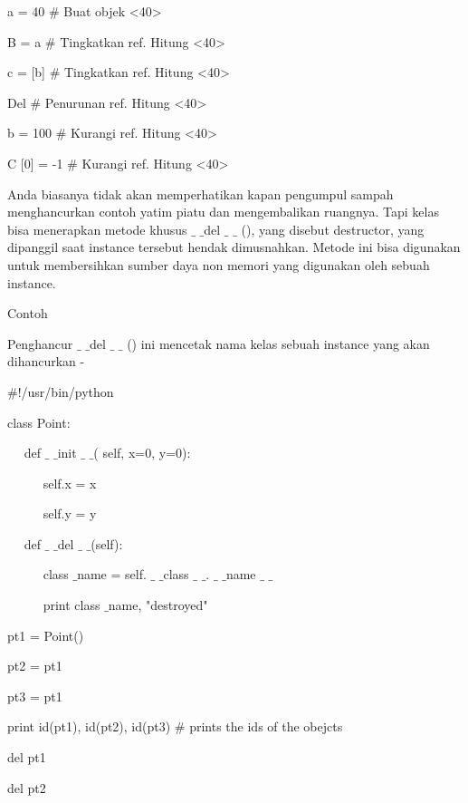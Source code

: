 \vspace{12pt}
a = 40  $  \#  $ Buat objek <40> \par
B = a  $  \#  $ Tingkatkan ref. Hitung <40> \par
c = [b]  $  \#  $ Tingkatkan ref. Hitung <40> \par
\vspace{12pt}
Del  $  \#  $ Penurunan ref. Hitung <40> \par
b = 100  $  \#  $ Kurangi ref. Hitung <40> \par
C [0] = -1  $  \#  $ Kurangi ref. Hitung <40> \par
\vspace{12pt}
Anda biasanya tidak akan memperhatikan kapan pengumpul sampah menghancurkan contoh yatim piatu dan mengembalikan ruangnya. Tapi kelas bisa menerapkan metode khusus  $  \_  $ $  \_  $del  $  \_  $ $  \_  $ (), yang disebut destructor, yang dipanggil saat instance tersebut hendak dimusnahkan. Metode ini bisa digunakan untuk membersihkan sumber daya non memori yang digunakan oleh sebuah instance. \par
Contoh \par
\vspace{12pt}
Penghancur  $  \_  $ $  \_  $del  $  \_  $ $  \_  $ () ini mencetak nama kelas sebuah instance yang akan dihancurkan - \par
 $  \#  $!/usr/bin/python \par
\vspace{12pt}
class Point: \par
~~ def  $  \_  $ $  \_  $init $  \_  $ $  \_  $( self, x=0, y=0): \par
~~~~~ self.x = x \par
~~~~~ self.y = y \par
~~ def  $  \_  $ $  \_  $del $  \_  $ $  \_  $(self): \par
~~~~~ class $  \_  $name = self. $  \_  $ $  \_  $class $  \_  $ $  \_  $. $  \_  $ $  \_  $name $  \_  $ $  \_  $ \par
~~~~~ print class $  \_  $name, "destroyed" \par
\vspace{12pt}
pt1 = Point() \par
pt2 = pt1 \par
pt3 = pt1 \par
print id(pt1), id(pt2), id(pt3)  $  \#  $ prints the ids of the obejcts \par
del pt1 \par
del pt2 \par
